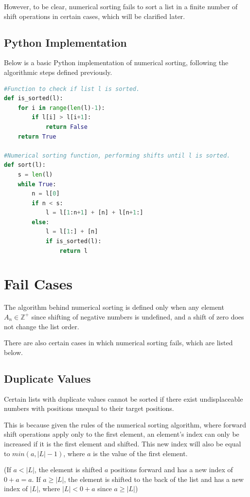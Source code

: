 \documentclass[12pt]{article}
\begin{document}
However, to be clear, numerical sorting fails to sort a list in a finite number of shift operations in certain cases, which will be clarified later.

\subsection*{Python Implementation}
Below is a basic Python implementation of numerical sorting, following the algorithmic steps defined previously.

\begin{lstlisting}[language=Python]
#Function to check if list l is sorted.
def is_sorted(l):
    for i in range(len(l)-1):
        if l[i] > l[i+1]:
            return False
    return True

#Numerical sorting function, performing shifts until l is sorted.
def sort(l):
    s = len(l)
    while True:
        n = l[0]
        if n < s:
            l = l[1:n+1] + [n] + l[n+1:]
        else:
            l = l[1:] + [n]
            if is_sorted(l):
                return l
\end{lstlisting}

\section{Fail Cases}
The algorithm behind numerical sorting is defined only when any element $A_n \in \mathbb{Z}^+$ since shifting of negative numbers is undefined, and a shift of zero does not change the list order.

There are also certain cases in which numerical sorting fails, which are listed below.

\subsection{Duplicate Values}
Certain lists with duplicate values cannot be sorted if there exist undisplaceable numbers with positions unequal to their target positions.

This is because given the rules of the numerical sorting algorithm, where forward shift operations apply only to the first element, an element's index can only be increased if it is the first element and shifted. This new index will also be equal to $min(a,|L|-1)$, where $a$ is the value of the first element.

(If $a<|L|$, the element is shifted $a$ positions forward and has a new index of $0+a=a$. If $a \geq |L|$, the element is shifted to the back of the list and has a new index of $|L|$, where $|L|<0+a$ since $a \geq |L|$)
\end{document}
